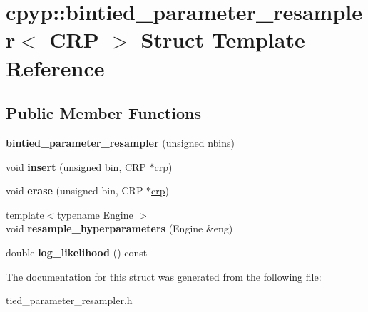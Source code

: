 \hypertarget{structcpyp_1_1bintied__parameter__resampler}{}\section{cpyp\+:\+:bintied\+\_\+parameter\+\_\+resampler$<$ C\+RP $>$ Struct Template Reference}
\label{structcpyp_1_1bintied__parameter__resampler}
\subsection*{Public Member Functions}
\begin{DoxyCompactItemize}
\item 
\mbox{\label{structcpyp_1_1bintied__parameter__resampler_a6870744bc6eabce286eb0c8e1bcad196}} 
{\bfseries bintied\+\_\+parameter\+\_\+resampler} (unsigned nbins)
\item 
\mbox{\label{structcpyp_1_1bintied__parameter__resampler_a854f0a13d7c2e2ba4fae5991619ae7d3}} 
void {\bfseries insert} (unsigned bin, C\+RP $\ast$\mbox{\hyperlink{classcpyp_1_1crp}{crp}})
\item 
\mbox{\label{structcpyp_1_1bintied__parameter__resampler_a7bb6e6788067c8a47cae42e0180ce658}} 
void {\bfseries erase} (unsigned bin, C\+RP $\ast$\mbox{\hyperlink{classcpyp_1_1crp}{crp}})
\item 
\mbox{\label{structcpyp_1_1bintied__parameter__resampler_a29820fe01b97a0f9335845f0feda8953}} 
{\footnotesize template$<$typename Engine $>$ }\\void {\bfseries resample\+\_\+hyperparameters} (Engine \&eng)
\item 
\mbox{\label{structcpyp_1_1bintied__parameter__resampler_aff02e1417bafb6967f858391ad38b85d}} 
double {\bfseries log\+\_\+likelihood} () const
\end{DoxyCompactItemize}


The documentation for this struct was generated from the following file\+:\begin{DoxyCompactItemize}
\item 
tied\+\_\+parameter\+\_\+resampler.\+h\end{DoxyCompactItemize}
